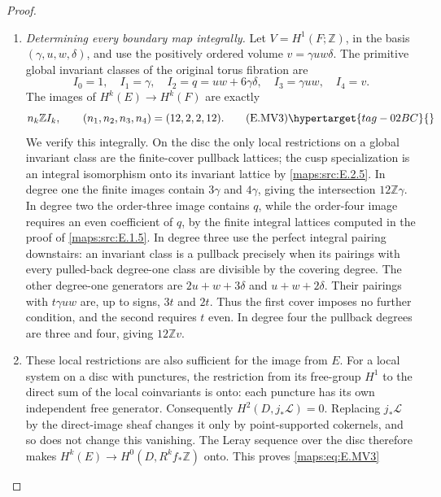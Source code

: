 \begin{proof}
\begin{enumerate}[label={$\langle1\rangle$\arabic*.},leftmargin=*]
\item \emph{Determining every boundary map integrally.}
Let $V=H^1(F;\mathbb Z)$, in the basis $(\gamma,u,w,\delta)$,
and use the positively ordered volume
$v=\gamma u w\delta$. The primitive global invariant classes
of the original torus fibration are
\[
 I_0=1,\quad I_1=\gamma,\quad
 I_2=q=uw+6\gamma\delta,\quad
 I_3=\gamma uw,\quad I_4=v.
\]
The images of $H^k(E)\to H^k(F)$ are exactly
\[
 n_k\mathbb Z I_k,\qquad
 (n_1,n_2,n_3,n_4)=(12,2,2,12).
 \tag{E.MV3}\hypertarget{tag-02BC}{}\label{maps:eq:E.MV3}
\]
We verify this integrally. On the disc the only local restrictions on a global
invariant class are the finite-cover pullback lattices;
the cusp specialization is an integral isomorphism onto its
invariant lattice by \ref{maps:src:E.2.5}. In degree one the finite images
contain $3\gamma$ and $4\gamma$, giving the intersection
$12\mathbb Z\gamma$. In degree two the order-three image
contains $q$, while the order-four image requires an even
coefficient of $q$, by the finite integral lattices computed in the proof of \cref{maps:src:E.1.5}.
In degree three use the perfect integral pairing downstairs:
an invariant class is a pullback precisely when its pairings
with every pulled-back degree-one class are divisible by the
covering degree. The other degree-one generators are
$2u+w+3\delta$ and $u+w+2\delta$. Their pairings with
$t\gamma uw$ are, up to signs, $3t$ and $2t$.
Thus the first cover imposes no further condition, and the
second requires $t$ even. In degree four the pullback degrees
are three and four, giving $12\mathbb Z v$.

\item These local restrictions are also sufficient for the image
from $E$. For a local system on a disc with punctures, the
restriction from its free-group $H^1$ to the direct sum of
the local coinvariants is onto: each puncture has its own
independent free generator. Consequently
$H^2(D,j_*\mathcal L)=0$. Replacing $j_*\mathcal L$ by the
direct-image sheaf changes it only by point-supported
cokernels, and so does not change this vanishing.
The Leray sequence over the disc therefore makes
$H^k(E)\to H^0(D,R^kf_*\mathbb Z)$ onto. This proves
\eqref{maps:eq:E.MV3} 


\end{enumerate}
\end{proof}
